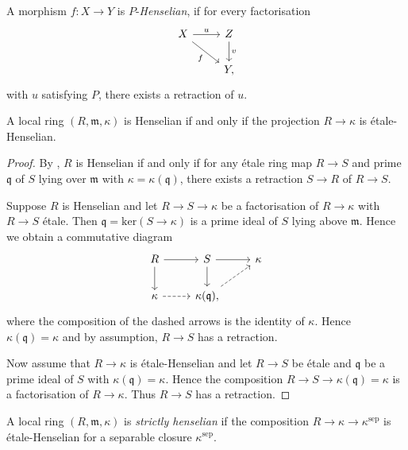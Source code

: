 \begin{definition}[Henselian]
    A morphism $f\colon X \to Y$ is $P$-\emph{Henselian}, if for every factorisation
    \[
    \begin{tikzcd}
        X \arrow{r}{u} \arrow[swap]{dr}{f} & Z \arrow{d}{v} \\
                    & Y,
    \end{tikzcd}
    \] with $u$ satisfying $P$, there exists a retraction of $u$.
    \label{def:p-henselian}
\end{definition}

\begin{example}
    A local ring $(R, \mathfrak{m}, \kappa)$ is Henselian if and only if the projection $R \to \kappa$ is étale-Henselian.
\end{example}

\begin{proof}
    By {\cite[\href{https://stacks.math.columbia.edu/tag/04GG}{Tag 04GG}]{stacks-project}}, $R$ is Henselian if and only if
    for any étale ring map $R \to S$ and prime $\mathfrak{q}$ of $S$ lying over $\mathfrak{m}$ with $\kappa = \kappa(\mathfrak{q})$,
    there exists a retraction $S \to R$ of $R \to S$.

    Suppose $R$ is Henselian and let $R \to S \to \kappa$ be a factorisation of $R \to \kappa$ with $R \to S$ étale. Then
    $\mathfrak{q} = \mathrm{ker}(S \to \kappa)$ is a prime ideal of $S$ lying above $\mathfrak{m}$. Hence we obtain a commutative
    diagram
    \[
        \begin{tikzcd}
        R \arrow{r} \arrow{d} & S \arrow{r} \arrow{d} & \kappa \\
        \kappa \arrow[dashed]{r} & \kappa(\mathfrak{q}) \arrow[dashed]{ur},
        \end{tikzcd}
    \] where the composition of the dashed arrows is the identity of $\kappa$. Hence $\kappa(\mathfrak{q}) = \kappa$ and by assumption,
    $R \to S$ has a retraction.

    Now assume that $R \to \kappa$ is étale-Henselian and let $R \to S$ be étale and $\mathfrak{q}$ be a prime ideal of $S$ with
    $\kappa(\mathfrak{q}) = \kappa$. Hence the composition $R \to S \to \kappa(\mathfrak{q}) = \kappa$ is a factorisation
    of $R \to \kappa$. Thus $R \to S$ has a retraction.
\end{proof}


\begin{definition}
    \label{def:strictly-henselian-local-ring}
    A local ring $(R, \mathfrak{m}, \kappa)$ is \emph{strictly henselian} if the composition $R \to \kappa \to \kappa^{\mathrm{sep}}$ is étale-Henselian
    for a separable closure $\kappa^{\mathrm{sep}}$.
\end{definition}

